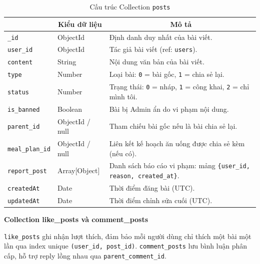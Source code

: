 \begin{table}[H]
\centering
\footnotesize
\setlength{\tabcolsep}{5pt}
\renewcommand{\arraystretch}{1.15}
\begin{tabularx}{\textwidth}{|p{3.6cm}|p{2.6cm}|X|}
\hline
\rowcolor{dbheadblue}
\multicolumn{1}{|c|}{\color{white}\textbf{Trường}} &
\multicolumn{1}{c|}{\color{white}\textbf{Kiểu dữ liệu}} &
\multicolumn{1}{c|}{\color{white}\textbf{Mô tả}} \\
\hline
\texttt{\_id}          & ObjectId        & Định danh duy nhất của bài viết. \\ \hline
\rowcolor{dbrowalt}
\texttt{user\_id}      & ObjectId        & Tác giả bài viết (ref: \texttt{users}). \\ \hline
\texttt{content}      & String          & Nội dung văn bản của bài viết. \\ \hline
\rowcolor{dbrowalt}
\texttt{type}         & Number          & Loại bài: \texttt{0} = bài gốc, \texttt{1} = chia sẻ lại. \\ \hline
\texttt{status}       & Number          & Trạng thái: \texttt{0} = nháp, \texttt{1} = công khai, \texttt{2} = chỉ mình tôi. \\ \hline
\rowcolor{dbrowalt}
\texttt{is\_banned}    & Boolean         & Bài bị Admin ẩn do vi phạm nội dung. \\ \hline
\texttt{parent\_id}    & ObjectId / null & Tham chiếu bài gốc nếu là bài chia sẻ lại. \\ \hline
\rowcolor{dbrowalt}
\texttt{meal\_plan\_id} & ObjectId / null & Liên kết kế hoạch ăn uống được chia sẻ kèm (nếu có). \\ \hline
\texttt{report\_post}  & Array[Object]   & Danh sách báo cáo vi phạm: mảng \texttt{\{user\_id, reason, created\_at\}}. \\ \hline
\rowcolor{dbrowalt}
\texttt{createdAt}    & Date            & Thời điểm đăng bài (UTC). \\ \hline
\texttt{updatedAt}    & Date            & Thời điểm chỉnh sửa cuối (UTC). \\ \hline
\end{tabularx}
\caption{Cấu trúc Collection \texttt{posts}}
\label{tab:col_posts}
\end{table}

\textbf{Collection like\_posts và comment\_posts}
\label{subsec:col_interactions}

\texttt{like\_posts} ghi nhận lượt thích, đảm bảo mỗi người dùng chỉ thích một bài một lần qua index unique \texttt{(user\_id, post\_id)}. \texttt{comment\_posts} lưu bình luận phân cấp, hỗ trợ reply lồng nhau qua \texttt{parent\_comment\_id}.

